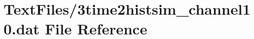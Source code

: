 \hypertarget{3time2histsim__channel10_8dat}{}\section{Text\+Files/3time2histsim\+\_\+channel10.dat File Reference}
\label{3time2histsim__channel10_8dat}
